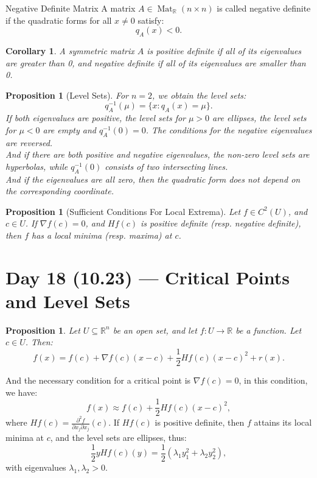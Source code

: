\documentclass[11pt]{article}
\makeatletter
\newcounter{thmcounter}
\newenvironment{definition}[1]{\begin{defbox}{#1}{}}{\end{defbox}}
\theoremstyle{quiet}
\newtheorem{proposition}[thmcounter]{Proposition}
\newtheorem{corollary}[thmcounter]{Corollary}
\newtheorem{proposition}[tcb@cnt@defbox]{Proposition}
\newtheorem{corollary}[tcb@cnt@defbox]{Corollary}
\theoremstyle{quietremark}
\makeatother
\begin{document}
\begin{definition}{Negative Definite Matrix}
A matrix $A\in\operatorname{Mat}_\mathbb{R}(n\times n)$ is called negative definite if the quadratic forms for all $x\ne 0$ satisfy:
\[
q_A(x)<0.
\]
\end{definition}

\begin{corollary}
A symmetric matrix $A$ is positive definite if all of its eigenvalues are greater than 0, and negative definite if all of its eigenvalues are smaller than 0.
\end{corollary}

\begin{proposition}[Level Sets]
For $n=2$, we obtain the level sets:
\[
q_A^{-1}(\mu)=\{x:q_A(x)=\mu\}.
\]
If both eigenvalues are positive, the level sets for $\mu>0$ are ellipses, the level sets for $\mu<0$ are empty and $q_A^{-1}(0)=0$. The conditions for the negative eigenvalues are reversed. \\
And if there are both positive and negative eigenvalues, the non-zero level sets are hyperbolas, while $q_A^{-1}(0)$ consists of two intersecting lines.\\
And if the eigenvalues are all zero, then the quadratic form does not depend on the corresponding coordinate.
\end{proposition}

\begin{proposition}[Sufficient Conditions For Local Extrema]
Let $f\in C^2(U)$, and $c\in U$. If $\nabla f(c)=0$, and $Hf(c)$ is positive definite (resp. negative definite), then $f$ has a local minima (resp. maxima) at $c$.
\end{proposition}


\newpage
\section{Day 18 (10.23) --- Critical Points and Level Sets}
\begin{proposition}
Let $U\subseteq\mathbb{R}^n$ be an open set, and let $f:U\to \mathbb{R}$ be a function. Let $c\in U$. Then:
\[
f(x)=f(c)+\nabla f(c)(x-c)+\frac{1}{2}Hf(c)(x-c)^2+r(x).
\]
\end{proposition}

And the necessary condition for a critical point is $\nabla f(c)=0$, in this condition, we have:
\[
f(x)\approx f(c)+\frac{1}{2}Hf(c)(x-c)^2,
\]
where $Hf(c)=\frac{\partial^2 f}{\partial x_j\partial x_j}(c)$.
If $Hf(c)$ is positive definite, then $f$ attains its local minima at $c$, and the level sets are ellipses, thus:
\[
\frac{1}{2}yHf(c)(y)=\frac{1}{2}(\lambda_1y_1^2+\lambda_2y_2^2),
\]
with eigenvalues $\lambda_1,\lambda_2>0$.
\end{document}
